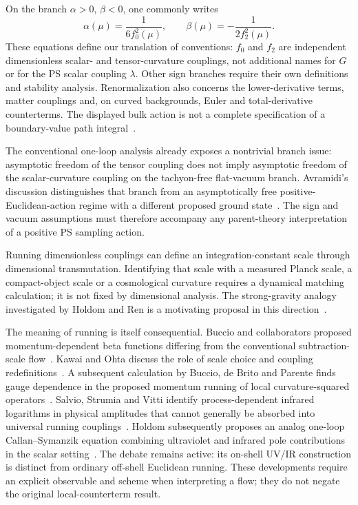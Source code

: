 On the branch $\alpha>0$, $\beta<0$, one commonly writes
\begin{equation}
 \alpha(\mu)=\frac{1}{6f_0^2(\mu)},\qquad
 \beta(\mu)=-\frac{1}{2f_2^2(\mu)}.
 \label{eq:parent-couplings}
\end{equation}
These equations define our translation of conventions: $f_0$ and $f_2$ are independent dimensionless scalar- and tensor-curvature couplings, not additional names for $G$ or for the PS scalar coupling $\lambda$.  Other sign branches require their own definitions and stability analysis.  Renormalization also concerns the lower-derivative terms, matter couplings and, on curved backgrounds, Euler and total-derivative counterterms.  The displayed bulk action is not a complete specification of a boundary-value path integral~\cite{Salvio:2018}.

The conventional one-loop analysis already exposes a nontrivial branch issue: asymptotic freedom of the tensor coupling does not imply asymptotic freedom of the scalar-curvature coupling on the tachyon-free flat-vacuum branch.  Avramidi's discussion distinguishes that branch from an asymptotically free positive-Euclidean-action regime with a different proposed ground state~\cite{Avramidi:Thesis}.  The sign and vacuum assumptions must therefore accompany any parent-theory interpretation of a positive PS sampling action.

Running dimensionless couplings can define an integration-constant scale through dimensional transmutation.  Identifying that scale with a measured Planck scale, a compact-object scale or a cosmological curvature requires a dynamical matching calculation; it is not fixed by dimensional analysis.  The strong-gravity analogy investigated by Holdom and Ren is a motivating proposal in this direction~\cite{HoldomRen:2016}.

The meaning of running is itself consequential.  Buccio and collaborators proposed momentum-dependent beta functions differing from the conventional subtraction-scale flow~\cite{Buccio:2024}.  Kawai and Ohta discuss the role of scale choice and coupling redefinitions~\cite{KawaiOhta:2025}.  A subsequent calculation by Buccio, de Brito and Parente finds gauge dependence in the proposed momentum running of local curvature-squared operators~\cite{BuccioGauge:2025}.  Salvio, Strumia and Vitti identify process-dependent infrared logarithms in physical amplitudes that cannot generally be absorbed into universal running couplings~\cite{SalvioStrumiaVitti:2026}.  Holdom subsequently proposes an analog one-loop Callan--Symanzik equation combining ultraviolet and infrared pole contributions in the scalar setting~\cite{Holdom:2026UVIR}.  The debate remains active: its on-shell UV/IR construction is distinct from ordinary off-shell Euclidean running.  These developments require an explicit observable and scheme when interpreting a flow; they do not negate the original local-counterterm result.

